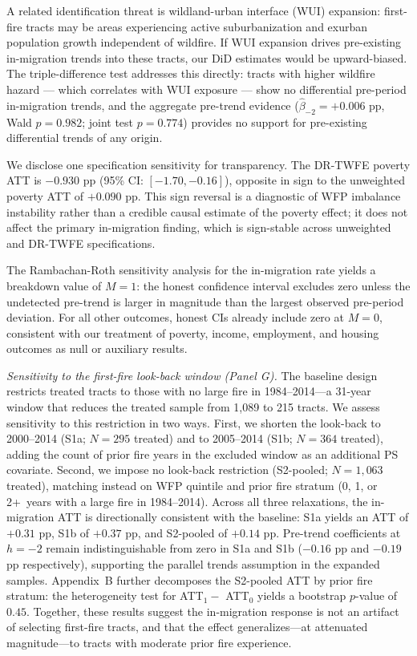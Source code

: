 \documentclass[12pt]{article}
\begin{document}
A related identification threat is wildland-urban interface (WUI)
expansion: first-fire tracts may be areas experiencing active
suburbanization and exurban population growth independent of wildfire.
If WUI expansion drives pre-existing in-migration trends into these tracts,
our DiD estimates would be upward-biased.
The triple-difference test addresses this directly: tracts with higher
wildfire hazard --- which correlates with WUI exposure --- show no
differential pre-period in-migration trends, and the aggregate
pre-trend evidence ($\hat{\beta}_{-2} = +0.006$ pp, Wald $p = 0.982$;
joint test $p = 0.774$) provides no support for pre-existing
differential trends of any origin.

We disclose one specification sensitivity for transparency.
The DR-TWFE poverty ATT is $-0.930$ pp (95\% CI: $[-1.70, -0.16]$),
opposite in sign to the unweighted poverty ATT of $+0.090$ pp.
This sign reversal is a diagnostic of WFP imbalance instability rather
than a credible causal estimate of the poverty effect; it does not
affect the primary in-migration finding, which is sign-stable
across unweighted and DR-TWFE specifications.

The Rambachan-Roth sensitivity analysis for the in-migration rate
yields a breakdown value of $M = 1$: the honest confidence interval
excludes zero unless the undetected pre-trend is larger in magnitude
than the largest observed pre-period deviation.
For all other outcomes, honest CIs already include zero at $M = 0$,
consistent with our treatment of poverty, income, employment,
and housing outcomes as null or auxiliary results.

\medskip\noindent\textit{Sensitivity to the first-fire look-back window (Panel G).}
The baseline design restricts treated tracts to those with no large fire in 1984--2014---a
31-year window that reduces the treated sample from 1,089 to 215 tracts.
We assess sensitivity to this restriction in two ways.
First, we shorten the look-back to 2000--2014 (S1a; $N = 295$ treated) and to 2005--2014
(S1b; $N = 364$ treated), adding the count of prior fire years in the excluded window
as an additional PS covariate.
Second, we impose no look-back restriction (S2-pooled; $N = 1{,}063$ treated),
matching instead on WFP quintile and prior fire stratum (0, 1, or 2+~years with a large fire
in 1984--2014).
Across all three relaxations, the in-migration ATT is directionally consistent with
the baseline: S1a yields an ATT of $+0.31$ pp, S1b of $+0.37$ pp,
and S2-pooled of $+0.14$ pp.
Pre-trend coefficients at $h = -2$ remain indistinguishable from zero in S1a and S1b
($-0.16$ pp and $-0.19$ pp respectively), supporting the parallel
trends assumption in the expanded samples.
Appendix~B further decomposes the S2-pooled ATT by prior fire stratum: the heterogeneity
test for ATT$_1 -$ ATT$_0$ yields a bootstrap $p$-value of $0.45$.
Together, these results suggest the in-migration response is not an artifact of selecting
first-fire tracts, and that the effect generalizes---at attenuated magnitude---to tracts
with moderate prior fire experience.
\end{document}
